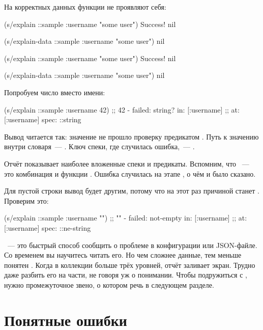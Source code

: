 \noindent
На корректных данных функции не проявляют себя:

\ifnarrow

\begin{clojure}
(s/explain ::sample
  {:username "some user"})
Success!
nil

(s/explain-data ::sample
  {:username "some user"})
nil
\end{clojure}

\else

\begin{clojure}
(s/explain ::sample {:username "some user"})
Success!
nil

(s/explain-data ::sample {:username "some user"})
nil
\end{clojure}

\fi

\noindent
Попробуем число вместо имени:

\begin{clojure}
(s/explain ::sample {:username 42})
;; 42 - failed: string? in: [:username]
;; at: [:username] spec: ::string
\end{clojure}

Вывод читается так: значение  не прошло проверку предикатом
. Путь к значению внутри словаря~--- \code{[:username]}. Ключ
спеки, где случилась ошибка,~--- .

Отчёт показывает наиболее вложенные спеки и предикаты. Вспомним, что
~--- это комбинация  и функции
. Ошибка случилась на этапе , о чём и было
сказано.

Для пустой строки вывод будет другим, потому что на этот раз причиной станет
. Проверим это:

\begin{clojure}
(s/explain ::sample {:username ""})
;; "" - failed: not-empty in: [:username]
;; at: [:username] spec: ::ne-string
\end{clojure}

~--- это быстрый способ сообщить о проблеме в конфигурации или
JSON-файле. Со временем вы научитесь читать его. Но чем сложнее данные, тем
меньше понятен . Когда в коллекции больше трёх уровней,
отчёт заливает экран. Трудно даже разбить его на части, не говоря уж о
понимании. Чтобы подружиться с , нужно промежуточное звено, о
котором речь в следующем разделе.

\section{Понятные ошибки}

